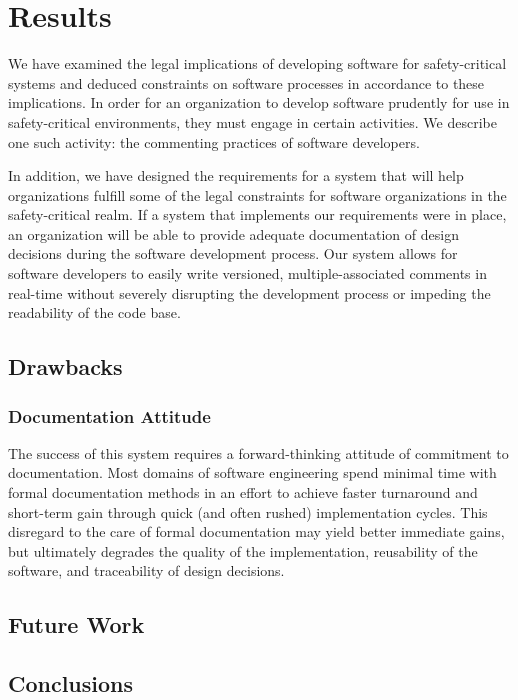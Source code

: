 \section{Results}
We have examined the legal implications of developing software for
safety-critical systems and deduced constraints on software processes in
accordance to these implications. In order for an organization to develop 
software prudently for use in safety-critical environments, they must engage in
certain activities. We describe one such activity: the commenting practices of
software developers.

In addition, we have designed the requirements for a system that will help
organizations fulfill some of the legal constraints for software organizations
in the safety-critical realm. If a system that implements our requirements were
in place, an organization will be able to provide adequate documentation of
design decisions during the software development process. Our system allows for
software developers to easily write versioned, multiple-associated comments in
real-time without severely disrupting the  development process or impeding the
readability of the code base.

\subsection{Drawbacks}

\subsubsection*{Documentation Attitude}
The success of this system requires a forward-thinking attitude of commitment to
documentation. Most domains of software engineering spend minimal time with
formal documentation methods in an effort to achieve faster turnaround and
short-term gain through quick (and often rushed) implementation cycles. This
disregard to the care of formal documentation may yield better immediate gains,
but ultimately degrades the quality of the implementation, reusability of the
software,  and traceability of design decisions.

\subsection{Future Work}

\subsection{Conclusions}
